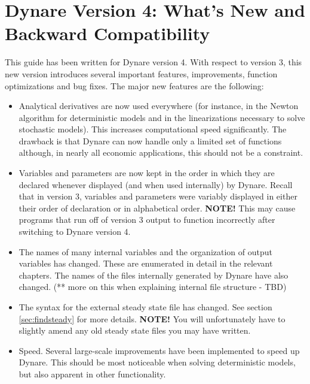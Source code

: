 \section{Dynare Version 4: What's New and Backward Compatibility}
This guide has been written for Dynare version 4. With respect to version 3, this new version introduces several important features, improvements, function optimizations and bug fixes. The major new features are the following: 
\begin{itemize}
\item Analytical derivatives are now used everywhere (for instance, in the Newton algorithm for deterministic models and in the linearizations necessary to solve stochastic models). This increases computational speed significantly. The drawback is that Dynare can now handle only a limited set of functions although, in nearly all economic applications, this should not be a constraint. 
\item Variables and parameters are now kept in the order in which they are declared whenever displayed (and when used internally) by Dynare. Recall that in version 3, variables and parameters were variably displayed in either their order of declaration or in alphabetical order. \textbf{\textsf{NOTE!}} This may cause programs that run off of version 3 output to function incorrectly after switching to Dynare version 4.
\item The names of many internal variables and the organization of output variables has changed. These are enumerated in detail in the relevant chapters. The names of the files internally generated by Dynare have also changed. (** more on this when explaining internal file structure - TBD)
\item The syntax for the external steady state file has changed. See section \ref{sec:findsteady} for more details. \textbf{\textsf{NOTE!}} You will unfortunately have to slightly amend any old steady state files you may have written. 
\item Speed. Several large-scale improvements have been implemented to speed up Dynare. This should be most noticeable when solving deterministic models, but also apparent in other functionality.
\end{itemize}